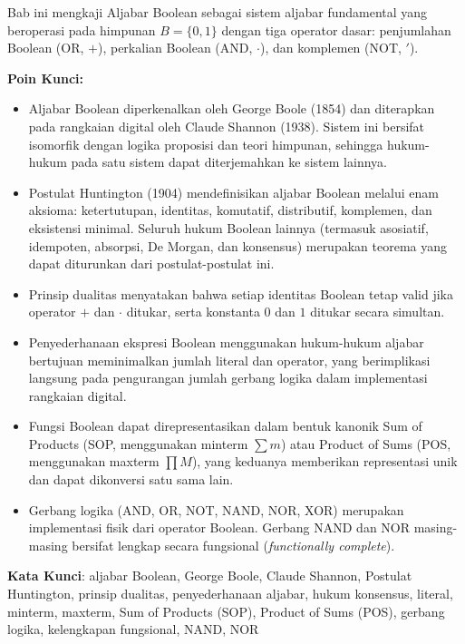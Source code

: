 \documentclass[../main]{subfiles}
\begin{document}
\begin{rangkuman}
Bab ini mengkaji Aljabar Boolean sebagai sistem aljabar fundamental yang beroperasi pada himpunan $B = \{0, 1\}$ dengan tiga operator dasar: penjumlahan Boolean (OR, $+$), perkalian Boolean (AND, $\cdot$), dan komplemen (NOT, $'$).

\textbf{Poin Kunci:}
\begin{itemize}
  \item Aljabar Boolean diperkenalkan oleh George Boole (1854) dan diterapkan pada rangkaian digital oleh Claude Shannon (1938). Sistem ini bersifat isomorfik dengan logika proposisi dan teori himpunan, sehingga hukum-hukum pada satu sistem dapat diterjemahkan ke sistem lainnya.
  \item Postulat Huntington (1904) mendefinisikan aljabar Boolean melalui enam aksioma: ketertutupan, identitas, komutatif, distributif, komplemen, dan eksistensi minimal. Seluruh hukum Boolean lainnya (termasuk asosiatif, idempoten, absorpsi, De Morgan, dan konsensus) merupakan teorema yang dapat diturunkan dari postulat-postulat ini.
  \item Prinsip dualitas menyatakan bahwa setiap identitas Boolean tetap valid jika operator $+$ dan $\cdot$ ditukar, serta konstanta $0$ dan $1$ ditukar secara simultan.
  \item Penyederhanaan ekspresi Boolean menggunakan hukum-hukum aljabar bertujuan meminimalkan jumlah literal dan operator, yang berimplikasi langsung pada pengurangan jumlah gerbang logika dalam implementasi rangkaian digital.
  \item Fungsi Boolean dapat direpresentasikan dalam bentuk kanonik Sum of Products (SOP, menggunakan minterm $\sum m$) atau Product of Sums (POS, menggunakan maxterm $\prod M$), yang keduanya memberikan representasi unik dan dapat dikonversi satu sama lain.
  \item Gerbang logika (AND, OR, NOT, NAND, NOR, XOR) merupakan implementasi fisik dari operator Boolean. Gerbang NAND dan NOR masing-masing bersifat lengkap secara fungsional (\textit{functionally complete}).
\end{itemize}

\textbf{Kata Kunci}: aljabar Boolean, George Boole, Claude Shannon, Postulat Huntington, prinsip dualitas, penyederhanaan aljabar, hukum konsensus, literal, minterm, maxterm, Sum of Products (SOP), Product of Sums (POS), gerbang logika, kelengkapan fungsional, NAND, NOR
\end{rangkuman}

\ifSubfilesClassLoaded{
  \renewcommand{\bibname}{Daftar Pustaka}
  
  
}{}
\end{document}
